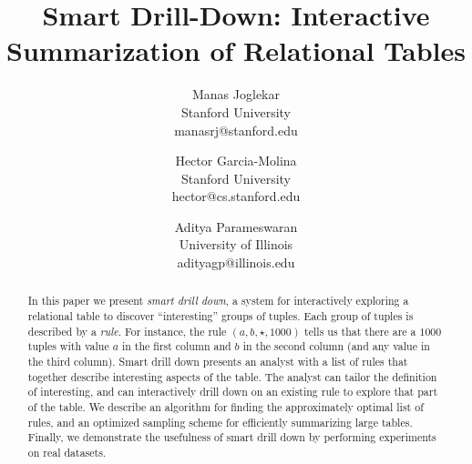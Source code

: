 \documentclass{sig-alternate}
\title{Smart Drill-Down: Interactive Summarization of Relational Tables}
\author{
Manas Joglekar\\Stanford University\\manasrj@stanford.edu
\and
Hector Garcia-Molina\\Stanford University\\hector@cs.stanford.edu
\and
Aditya Parameswaran\\University of Illinois\\adityagp@illinois.edu
}
\newcommand{\techreporttext}[1]{#1}
\begin{document}
\maketitle


\begin{abstract}
In this paper we present {\em smart drill down},
a system for interactively exploring a relational table
to discover ``interesting'' groups of tuples.
Each group of tuples is described by a {\em rule}.
For instance, the rule $(a, b, \star, 1000)$ tells us that
there are a $1000$ tuples with value $a$ in the first column and $b$
in the second column (and any value in the third column).
Smart drill down presents an analyst with a list of rules that
together describe interesting aspects of the table.
The analyst can tailor the definition of interesting,
and can interactively drill down on an existing rule to
explore that part of the table.
We describe an
algorithm for finding the approximately optimal list of rules, and an optimized
sampling scheme for efficiently summarizing large tables. Finally, we
demonstrate the usefulness of smart drill down by performing experiments on
real datasets.
\end{abstract}















{\small 


}
\techreporttext{}
\end{document}
